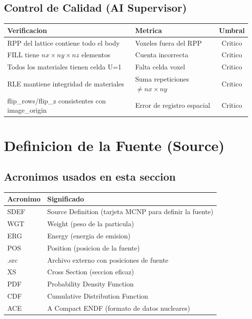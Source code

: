 \documentclass[12pt,a4paper]{article}
\begin{document}
\subsection{Control de Calidad (AI Supervisor)}

\begin{table}[H]
\centering
\begin{tabular}{llc}
\toprule
\textbf{Verificacion} & \textbf{Metrica} & \textbf{Umbral} \\
\midrule
RPP del lattice contiene todo el body & Voxeles fuera del RPP & Critico \\
FILL tiene $nx \times ny \times nz$ elementos & Cuenta incorrecta & Critico \\
Todos los materiales tienen celda U=1 & Falta celda voxel & Critico \\
RLE mantiene integridad de materiales & Suma repeticiones $\neq nx \times ny$ & Critico \\
flip\_rows/flip\_z consistentes con image\_origin & Error de registro espacial & Critico \\
\bottomrule
\end{tabular}
\end{table}

\newpage

\section{Definicion de la Fuente (Source)}
\label{sec:fuente}

\subsection*{Acronimos usados en esta seccion}
\begin{tabular}{ll}
\toprule
\textbf{Acronimo} & \textbf{Significado} \\
\midrule
SDEF & Source Definition (tarjeta MCNP para definir la fuente) \\
WGT & Weight (peso de la particula) \\
ERG & Energy (energia de emision) \\
POS & Position (posicion de la fuente) \\
.src & Archivo externo con posiciones de fuente \\
XS & Cross Section (seccion eficaz) \\
PDF & Probability Density Function \\
CDF & Cumulative Distribution Function \\
ACE & A Compact ENDF (formato de datos nucleares) \\
\bottomrule
\end{tabular}
\end{document}
